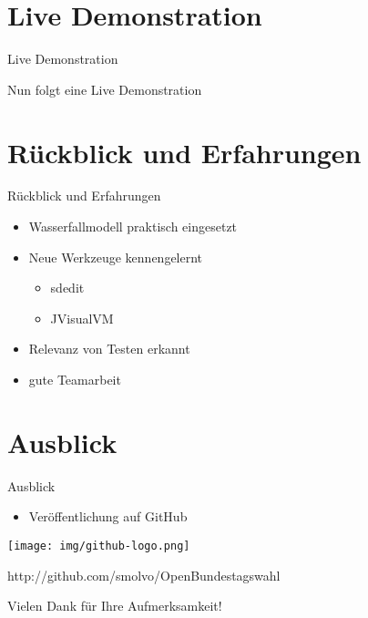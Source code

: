 \documentclass[18pt]{beamer}
\begin{document}
\section{Live Demonstration}
\begin{frame}{Live Demonstration}
\begin{LARGE}
\begin{center}
	Nun folgt eine Live Demonstration
\end{center}
\end{LARGE}
\end{frame}

\section{Rückblick und Erfahrungen}
\begin{frame}{Rückblick und Erfahrungen}
\begin{itemize}
	\item Wasserfallmodell praktisch eingesetzt
	\item Neue Werkzeuge kennengelernt
	\begin{itemize}
	\item sdedit
	\item JVisualVM
	\end{itemize}		
	\item Relevanz von Testen erkannt
	\item gute Teamarbeit
\end{itemize}
\end{frame}

\section{Ausblick}
\begin{frame}{Ausblick}
\begin{itemize}
	\item Veröffentlichung auf GitHub
\end{itemize}
\begin{center}
	\texttt{[image: img/github-logo.png]}
\end{center}
\begin{center}
http://github.com/smolvo/OpenBundestagswahl 
\end{center}


\end{frame}

\appendix

\begin{frame}{}

\begin{LARGE}
\begin{center}
	Vielen Dank für Ihre Aufmerksamkeit!
\end{center}
\end{LARGE}
\end{frame}
\end{document}
